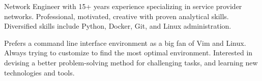 

\begin{cvparagraph}


Network Engineer with 15+ years experience specializing in service provider
    networks. Professional, motivated, creative with proven analytical skills.
    Diversified skills include Python, Docker, Git, and Linux administration.

Prefers a command line interface environment as a big fan
    of Vim and Linux. Always trying to customize to find the most
    optimal environment. Interested in devising a better problem-solving method
    for challenging tasks, and learning new technologies and tools.
\end{cvparagraph}
